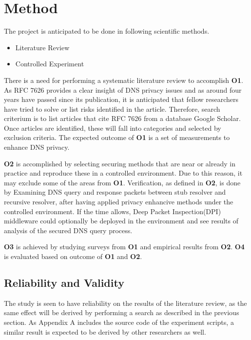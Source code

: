 \documentclass[a4paper,12pt]{article}
\begin{document}
\section{Method}
\label{Method}
The project is anticipated to be done in following scientific methods.
\begin{itemize}
\item Literature Review
\item Controlled Experiment
\end{itemize}
There is a need for performing a systematic literature review to accomplish \textbf{O1}. As RFC 7626\cite{rfc7626} provides a clear insight of DNS privacy issues and as around four years have passed since its publication, it is anticipated that fellow researchers have tried to solve or list risks identified in the article. Therefore, search criterium is to list articles that cite RFC 7626 from a database Google Scholar. Once articles are identified, these will fall into categories and selected by exclusion criteria.
The expected outcome of \textbf{O1} is a set of measurements to enhance DNS privacy.

\textbf{O2} is accomplished by selecting securing methods that are near or already in practice and reproduce these in a controlled environment. Due to this reason, it may exclude some of the areas from \textbf{O1}. Verification, as defined in \textbf{O2}, is done by Examining DNS query and response packets between stub resolver and recursive resolver, after having applied privacy enhancive methods under the controlled environment. If the time allows, Deep Packet Inspection(DPI) middleware could optionally be deployed in the environment and see results of analysis of the secured DNS query process.

\textbf{O3} is achieved by studying surveys from \textbf{O1} and empirical results from \textbf{O2}. \textbf{O4} is evaluated based on outcome of \textbf{O1} and \textbf{O2}.

\subsection{Reliability and Validity}
The study is seen to have reliability on the results of the literature review, as the same effect will be derived by performing a search as described in the previous section. As Appendix A includes the source code of the experiment scripts, a similar result is expected to be derived by other researchers as well. 
\end{document}
